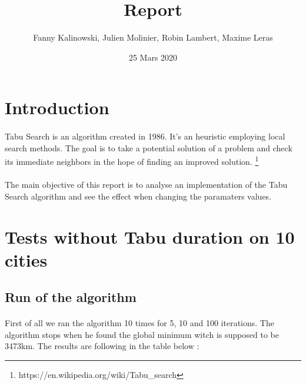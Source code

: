 \documentclass[12pt,oneside,a4paper]{article}
\begin{document}
\title{Report}
\author{Fanny Kalinowski, Julien Molinier, Robin Lambert, Maxime Leras}
\date{25 Mars 2020}
\maketitle
\newpage    
\tableofcontents

\newpage
{}
\section{Introduction}
\paragraph{}
    Tabu Search is an algorithm created in 1986. It's an heuristic employing
    local search methods. The goal is to take a potential solution of a problem
    and check its immediate neighbors in the hope of finding an improved solution.
    \footnote{https://en.wikipedia.org/wiki/Tabu\_search}
\paragraph{}
    The main objective of this report is to analyse an implementation of
    the Tabu Search algorithm and see the effect when changing the paramaters values.




\section{Tests without Tabu duration on 10 cities}
\subsection{Run of the algorithm}
\paragraph{}
    First of all we ran the algorithm 10 times for 5, 10 and 100 iterations. The algorithm stops when he found
    the global minimum witch is supposed to be 3473km. The results are following in the table below :    
\end{document}
